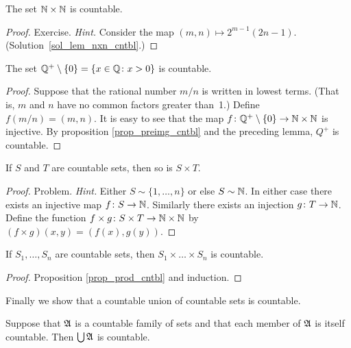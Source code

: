 \begin{lem}\label{lem_nxn_cntbl}  The set $\mathbb{N} \times \mathbb{N}$ is countable.
\end{lem}

\begin{proof} Exercise. \emph{Hint.}   Consider the map $(m,n) \mapsto 2^{m-1}(2n - 1)$.
(Solution~\ref{sol_lem_nxn_cntbl}.) \ns
\end{proof}

\begin{exam}\label{exam_qplus_cntbl} The set $\mathbb{Q}^+ \setminus \{0\} = \{x \in \mathbb{Q} \colon x > 0\}$
is countable.
\end{exam}

\begin{proof} Suppose that the rational number $m/n$ is written in lowest terms. (That is, $m$
and $n$ have no common factors greater than~1.) Define $f(m/n) = (m,n)$. It is easy to see
that the map $f \colon \mathbb{Q}^+\setminus\{0\} \rightarrow \mathbb{N} \times \mathbb{N}$ is injective. By proposition
\ref{prop_preimg_cntbl} and the preceding lemma, $Q^+$ is countable.
\end{proof}

\begin{prop}\label{prop_prod_cntbl} If $S$ and $T$ are countable sets, then so is $S \times T$.
\end{prop}

\begin{proof} Problem.  \emph{Hint.}  Either $S \sim \{1,\dots,n\}$ or else $S \sim \mathbb{N}$. In
either case there exists an injective map $f \colon S \rightarrow \mathbb{N}$. Similarly there exists an
injection $g \colon T \rightarrow \mathbb{N}$. Define the function $f \times g \colon S \times T \rightarrow \mathbb{N}
\times \mathbb{N}$ by $(f \times g)(x,y) = (f(x),g(y))$.   \ns
\end{proof}

\begin{cor}  If $S_1, \dots, S_n$ are countable sets, then $S_1 \times\dots\times S_n$ is
countable.
\end{cor}

\begin{proof} Proposition \ref{prop_prod_cntbl} and induction.
\end{proof}

Finally we show that a countable union of countable sets is countable.

\begin{prop}\label{prop_union_cntbl}  Suppose that $\mathfrak{A}$ is a countable family of sets and
that each member of $\mathfrak{A}$ is itself countable. Then $\bigcup\mathfrak{A}$ is countable.
\end{prop}

